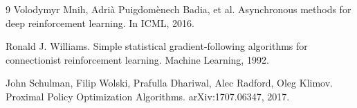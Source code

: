 \documentclass[11pt]{article}
\begin{document}
\clearpage

\begin{thebibliography}{9}
Volodymyr Mnih, Adrià Puigdomènech Badia, et al.
Asynchronous methods for deep reinforcement learning.
In ICML, 2016.

Ronald J. Williams.
Simple statistical gradient-following algorithms for connectionist reinforcement learning.
Machine Learning, 1992.

John Schulman, Filip Wolski, Prafulla Dhariwal, Alec Radford, Oleg Klimov.
Proximal Policy Optimization Algorithms. arXiv:1707.06347, 2017.
\end{thebibliography}
\end{document}
